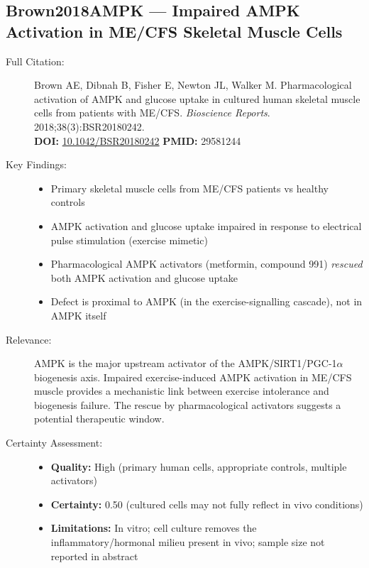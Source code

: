 \subsection*{Brown2018AMPK --- Impaired AMPK Activation in ME/CFS Skeletal Muscle Cells}
\begin{description}
    \item[Full Citation:] Brown AE, Dibnah B, Fisher E, Newton JL, Walker M. Pharmacological activation of AMPK and glucose uptake in cultured human skeletal muscle cells from patients with ME/CFS. \textit{Bioscience Reports}. 2018;38(3):BSR20180242.\\
    \textbf{DOI:} \href{https://doi.org/10.1042/BSR20180242}{10.1042/BSR20180242} \quad \textbf{PMID:} 29581244
    \item[Key Findings:]
    \begin{itemize}
        \item Primary skeletal muscle cells from ME/CFS patients vs healthy controls
        \item AMPK activation and glucose uptake impaired in response to electrical pulse stimulation (exercise mimetic)
        \item Pharmacological AMPK activators (metformin, compound 991) \emph{rescued} both AMPK activation and glucose uptake
        \item Defect is proximal to AMPK (in the exercise-signalling cascade), not in AMPK itself
    \end{itemize}
    \item[Relevance:] AMPK is the major upstream activator of the AMPK/SIRT1/PGC-1$\alpha$ biogenesis axis. Impaired exercise-induced AMPK activation in ME/CFS muscle provides a mechanistic link between exercise intolerance and biogenesis failure. The rescue by pharmacological activators suggests a potential therapeutic window.
    \item[Certainty Assessment:]
    \begin{itemize}
        \item \textbf{Quality:} High (primary human cells, appropriate controls, multiple activators)
        \item \textbf{Certainty:} 0.50 (cultured cells may not fully reflect in vivo conditions)
        \item \textbf{Limitations:} In vitro; cell culture removes the inflammatory/hormonal milieu present in vivo; sample size not reported in abstract
    \end{itemize}
\end{description}

